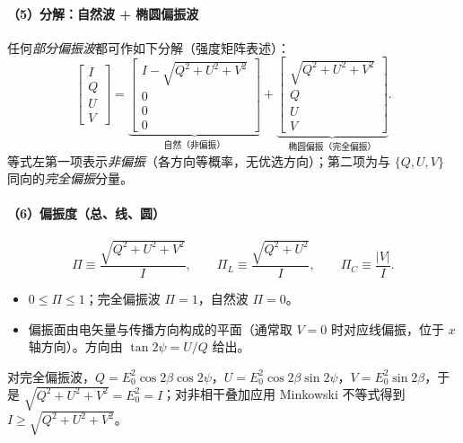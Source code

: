 \paragraph{（5）分解：自然波 + 椭圆偏振波}
任何\emph{部分偏振波}都可作如下分解（强度矩阵表述）：
\[
\begin{bmatrix} I\\ Q\\ U\\ V\end{bmatrix}
=
\underbrace{\begin{bmatrix} I-\sqrt{Q^2+U^2+V^2}\\ 0\\ 0\\ 0\end{bmatrix}}_{\text{自然（非偏振）}}
+
\underbrace{\begin{bmatrix} \sqrt{Q^2+U^2+V^2}\\ Q\\ U\\ V\end{bmatrix}}_{\text{椭圆偏振（完全偏振）}} .
\]
等式左第一项表示\emph{非偏振}（各方向等概率，无优选方向）；第二项为与 $\{Q,U,V\}$ 同向的\emph{完全偏振}分量。

\paragraph{（6）偏振度（总、线、圆）}
\[
\Pi \equiv \frac{\sqrt{Q^2+U^2+V^2}}{I},\qquad
\Pi_L \equiv \frac{\sqrt{Q^2+U^2}}{I},\qquad
\Pi_C \equiv \frac{|V|}{I}.
\]
\begin{itemize}[leftmargin=2em]
  \item $0\le \Pi \le 1$；完全偏振波 $\Pi=1$，自然波 $\Pi=0$。
  \item 偏振面由电矢量与传播方向构成的平面（通常取 $V=0$ 时对应线偏振，位于 $x$ 轴方向）。方向由 $\tan 2\psi=U/Q$ 给出。
\end{itemize}

\begin{derivationnote}
对完全偏振波，$Q=E_0^2\cos2\beta\cos2\psi$，$U=E_0^2\cos2\beta\sin2\psi$，$V=E_0^2\sin2\beta$，于是
$\sqrt{Q^2+U^2+V^2}=E_0^2=I$；对非相干叠加应用 Minkowski 不等式得到 $I\ge\sqrt{Q^2+U^2+V^2}$。
\end{derivationnote}

